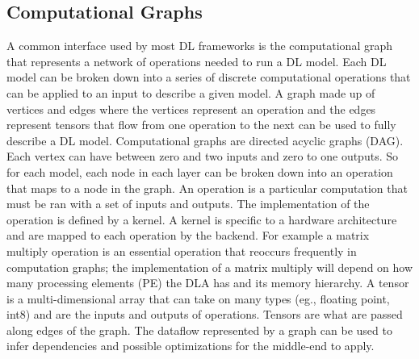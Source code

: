 \subsection{Computational Graphs}
A common interface used by most DL frameworks is the computational graph
\cite{tensorflow} \cite{cntk} that represents a network of operations needed to
run a DL model. Each DL model can be broken down into a series of discrete
computational operations that can be applied to an input to describe a given
model. A graph made up of vertices and edges where the vertices represent an
operation and the edges represent tensors that flow from one operation to the
next can be used to fully describe a DL model. Computational graphs are
directed acyclic graphs (DAG).  Each vertex can have between zero and two
inputs and zero to one outputs. So for each model, each node in each layer can
be broken down into an operation that maps to a node in the graph. An operation
is a particular computation that must be ran with a set of inputs and outputs.
The implementation of the operation is defined by a kernel. A kernel is
specific to a hardware architecture and are mapped to each operation by the
backend. For example a matrix multiply operation is an essential operation
that reoccurs frequently in computation graphs; the implementation of a matrix
multiply will depend on how many processing elements (PE) the DLA has and its
memory hierarchy. A tensor is a multi-dimensional array that can take on many
types (eg., floating point, int8) and are the inputs and outputs of operations.
Tensors are what are passed along edges of the graph. The dataflow represented
by a graph can be used to infer dependencies and possible optimizations for the
middle-end to apply.







